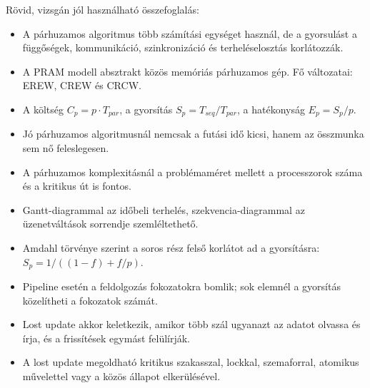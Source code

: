 Rövid, vizsgán jól használható összefoglalás:

\begin{itemize}
  \item A párhuzamos algoritmus több számítási egységet használ, de a gyorsulást a függőségek, kommunikáció, szinkronizáció és terheléselosztás korlátozzák.
  \item A PRAM modell absztrakt közös memóriás párhuzamos gép. Fő változatai: EREW, CREW és CRCW.
  \item A költség $C_p=p\cdot T_{par}$, a gyorsítás $S_p=T_{seq}/T_{par}$, a hatékonyság $E_p=S_p/p$.
  \item Jó párhuzamos algoritmusnál nemcsak a futási idő kicsi, hanem az összmunka sem nő feleslegesen.
  \item A párhuzamos komplexitásnál a problémaméret mellett a processzorok száma és a kritikus út is fontos.
  \item Gantt-diagrammal az időbeli terhelés, szekvencia-diagrammal az üzenetváltások sorrendje szemléltethető.
  \item Amdahl törvénye szerint a soros rész felső korlátot ad a gyorsításra: $S_p=1/((1-f)+f/p)$.
  \item Pipeline esetén a feldolgozás fokozatokra bomlik; sok elemnél a gyorsítás közelítheti a fokozatok számát.
  \item Lost update akkor keletkezik, amikor több szál ugyanazt az adatot olvassa és írja, és a frissítések egymást felülírják.
  \item A lost update megoldható kritikus szakasszal, lockkal, szemaforral, atomikus művelettel vagy a közös állapot elkerülésével.
\end{itemize}
